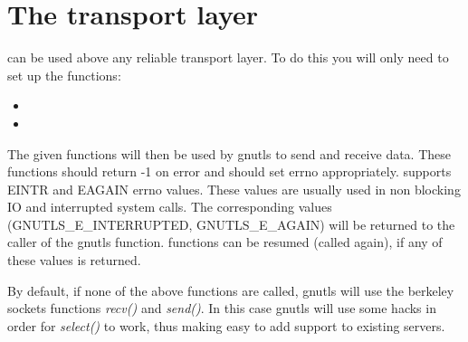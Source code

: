 \section{The transport layer}
\par
\gnutls{} can be used above any reliable transport layer. To do this you will only 
need to set up the functions:
\begin{itemize}
\item {}
\item {}
\end{itemize}
The given functions will then be used by gnutls to send and receive data.
These functions should return -1 on error and should set errno appropriately.
\gnutls{} supports EINTR and EAGAIN errno values. These values are
usually used in non blocking IO and interrupted system calls.
The corresponding values (GNUTLS\_E\_INTERRUPTED, GNUTLS\_E\_AGAIN) 
will be returned to the caller of the gnutls function. \gnutls{} functions
can be resumed (called again), if any of these values is returned.
\par
By default, if none of the above functions are called, gnutls will use
the berkeley sockets functions \emph{recv()} and \emph{send()}. In this case
gnutls will use some hacks in order for \emph{select()} to work, thus
making easy to add \tls{} support to existing servers.
